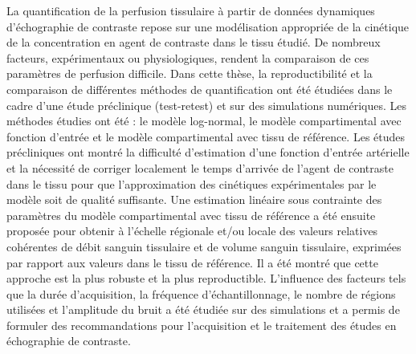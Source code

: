 %
%
%
La quantification de la perfusion tissulaire \`a partir de donn\'ees dynamiques d'\'echographie de contraste repose sur une mod\'elisation appropri\'ee de la cin\'etique de la concentration en agent de contraste dans le tissu \'etudi\'e. De nombreux facteurs, exp\'erimentaux ou physiologiques, rendent la comparaison de ces param\`etres de perfusion difficile.
Dans cette th\`ese, la reproductibilit\'e et la comparaison de diff\'erentes m\'ethodes de quantification ont \'et\'e \'etudi\'ees dans le cadre d'une \'etude pr\'eclinique (test-retest) et sur des simulations num\'eriques. Les m\'ethodes \'etudies ont \'et\'e : le mod\`ele log-normal, le mod\`ele compartimental avec fonction d'entr\'ee et le mod\`ele compartimental avec tissu de r\'ef\'erence. Les \'etudes pr\'ecliniques ont montr\'e la difficult\'e d'estimation d'une fonction d'entr\'ee art\'erielle et la n\'ecessit\'e de corriger localement le temps d'arriv\'ee de l'agent de contraste dans le tissu pour que l'approximation des cin\'etiques exp\'erimentales par le mod\`ele soit de qualit\'e suffisante.
Une estimation lin\'eaire sous contrainte des param\`etres du mod\`ele compartimental avec tissu de r\'ef\'erence a \'et\'e ensuite propos\'ee pour obtenir \`a l'\'echelle r\'egionale et/ou locale des valeurs relatives coh\'erentes de d\'ebit sanguin tissulaire et de volume sanguin tissulaire, exprim\'ees par rapport aux valeurs dans le tissu de r\'ef\'erence. Il a \'et\'e montr\'e que cette approche est la plus robuste et la plus reproductible. L'influence des facteurs tels que la dur\'ee d'acquisition, la fr\'equence d'\'echantillonnage, le nombre de r\'egions utilis\'ees et l'amplitude du bruit a \'et\'e \'etudi\'ee sur des simulations et a permis de formuler des recommandations pour l'acquisition et le traitement des \'etudes en \'echographie de contraste.
